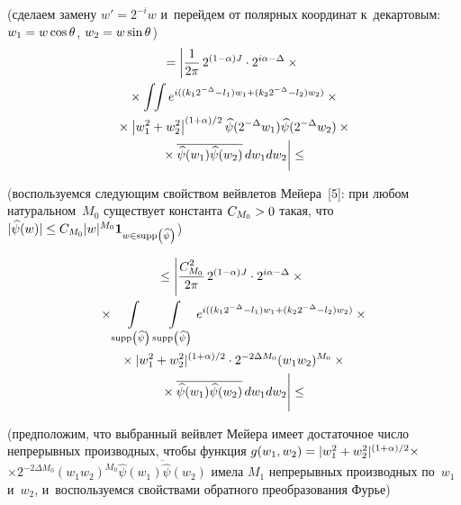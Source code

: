 \begin{multicols}{2}
\vspace*{-2pt}

\noindent
(сделаем замену $w' = 2^{-i} w$ и~перейдем от полярных координат к~декартовым:
$w_1 \hm= w \cos\theta$, $w_2 \hm= w\sin\theta$)
%
\begin{multline*}
=\left\vert \fr{1}{2\pi}\, 2^{(1-\alpha)J}\cdot 2^{i\alpha-\Delta}\times{}\right.\\
{}\times \int\!\! \int
e^{i((k_1 2^{-\Delta} - l_1) w_1+(k_2 2^{-\Delta} - l_2) w_2 )} \times{}
\\
{}\times \left\vert w_1^2 +w_2^2\right\vert^{(1+\alpha)/2} \widehat{\psi}(2^{-\Delta}w_1)
 \widehat{\psi}(2^{-\Delta}w_2) \times{}\\
\left. {}\times\overline{ \widehat{\psi}(w_1) \widehat{\psi}(w_2)}\,  d w_1 d w_2
\vphantom{\fr{1}{2\pi}}\right\vert \leq{}
\end{multline*}


\vspace*{-2pt}

\noindent
(воспользуемся следующим свойством вейвлетов Мейера~[5]: при любом натуральном~$M_0$
существует константа $C_{M_0}\hm>0$ такая, что  $|\widehat{\psi}(w)|\hm\leq
C_{M_0}|w|^{M_0}\textbf{1}_{w\in \mathrm{supp}\left(\widehat{\psi}\right)}$)

\noindent
\begin{multline*}
\leq\left\vert \fr{C^2_{M_0}}{2\pi}\,
2^{(1-\alpha)J}\cdot 2^{i\alpha-\Delta}\times{}\right.\\
{}\times \int\limits_{\mathrm{supp}\left(\widehat{\psi}\right)}
\int\limits_{\mathrm{supp}\left(\widehat{\psi}\right)}
e^{i((k_1 2^{-\Delta} - l_1) w_1+(k_2 2^{-\Delta} - l_2) w_2 )} \times{}\\
{}\times |w_1^2 +w_2^2|^{(1+\alpha)/{2}}\cdot
2^{-2\Delta M_0}(w_1 w_2)^{M_0} \times{}\\
\left.{}\times\overline{ \widehat{\psi}(w_1)
\widehat{\psi}(w_2)} \, d w_1 d w_2
\vphantom{\fr{C^2_{M_0}}{2\pi}}\right\vert\leq{}\\
\end{multline*}

\vspace*{-14pt}

\noindent
(предположим, что выбранный вейвлет Мейера имеет достаточное число
непрерывных производных, чтобы функция $g(w_1,w_2) \hm=
|w_1^2\hm +w_2^2|^{({1+\alpha})/2} \times$\linebreak
$\times 2^{-2\Delta M_0}(w_1 w_2)^{M_0}
\overline{ \widehat{\psi}(w_1) \widehat{\psi}(w_2)}$ имела $M_1$
непрерывных производных по~$w_1$ и~$w_2$, и~воспользуемся свойствами
обратного преобразования Фурье)


\end{multicols}
